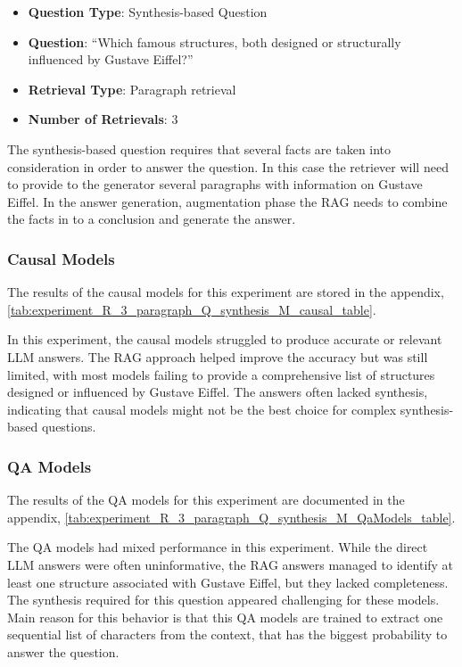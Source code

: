 \documentclass{wseas}
\begin{document}
\begin{itemize}
  \item
    \textbf{Question Type}: Synthesis-based Question
  \item
    \textbf{Question}: ``Which famous structures, both designed or
    structurally influenced by Gustave Eiffel?''
  \item
    \textbf{Retrieval Type}: Paragraph retrieval
  \item
    \textbf{Number of Retrievals}: 3
\end{itemize}

The synthesis-based question requires that several facts are taken into
consideration in order to answer the question. In this case the
retriever will need to provide to the generator several paragraphs with
information on Gustave Eiffel. In the answer generation, augmentation phase 
the RAG needs to combine the facts in to a conclusion and generate the answer.

\subsubsection{Causal Models}

The results of the causal models for this experiment
are stored in the appendix, \autoref{tab:experiment_R_3_paragraph_Q_synthesis_M_causal_table}.

In this experiment, the causal models struggled to produce accurate or
relevant LLM answers. The RAG approach helped improve the accuracy but
was still limited, with most models failing to provide a comprehensive
list of structures designed or influenced by Gustave Eiffel. The answers
often lacked synthesis, indicating that causal models might not be the
best choice for complex synthesis-based questions.

\subsubsection{QA Models}

The results of the QA models for this experiment
are documented in the appendix, \autoref{tab:experiment_R_3_paragraph_Q_synthesis_M_QaModels_table}.

The QA models had mixed performance in this experiment. While the direct
LLM answers were often uninformative, the RAG answers managed to
identify at least one structure associated with Gustave Eiffel, but they
lacked completeness. The synthesis required for this question appeared
challenging for these models. Main reason for this behavior is that this QA models are trained
to extract one sequential list of characters from the context, that has the biggest probability
to answer the question.
\end{document}
